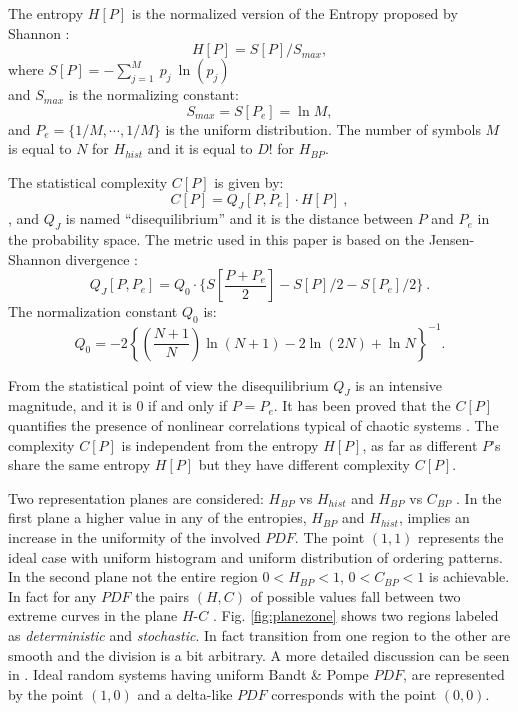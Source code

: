 The entropy $H[P]$ is the normalized version of the Entropy proposed by Shannon \cite{Shannon1949a}:
\begin{equation}\label{eq:sha}
H[P] = S[P] /S_{max},
\end{equation}
where $S[P]=-\sum _{j=1}^{M}~p_j~\ln( p_j )$\\ and $S_{max}$ is
the normalizing constant:
\begin{equation}
\label{eq:Smax} S_{max}= S[P_e] = \ln M,
\end{equation}
and $P_e=\{ 1/M, \cdots,1/M\}$ is the uniform distribution. The number of symbols $M$ is equal to $N$ for $H_{hist}$ and it is equal to $D!$ for $H_{BP}$.

The statistical complexity $C[P]$ is given by:
\begin{equation}
\label{eq:inten}
C[{P}]=Q_{J}[{P,P_e}]\cdot H[{P}] \ ,
\end{equation}
, and
$Q_{J}$ is named ``disequilibrium'' and it is the distance between $P$ and $P_e$ 
 in the probability space. The metric used in this paper is based on the Jensen-Shannon divergence
 \cite{Lamberti2004}:
\begin{equation}
\label{eq:disequi}
Q_{J}[{P,P_e}]= Q_0 \cdot \{S[\frac{P+P_e}{2}]-S[P]/2-S[P_e]/2 \} \ .
\end{equation}
The normalization constant $Q_0$ is:
\begin{equation}
\label{eq:q0j}
Q_0=-2 \left\{ \left( \frac{N+1}{N} \right) \ln(N+1) - 2 \ln(2N) + \ln N \right\}^{-1} .
\end{equation}

From the statistical point of view the disequilibrium $Q_J$ is an
intensive magnitude, and it is $0$ if and only if $P=P_e$. It has
been proved that the $C[P]$ quantifies the presence of nonlinear
correlations typical of chaotic systems
\cite{Martin2003,Lamberti2004}. The complexity $C[P]$ is
independent from the entropy $H[P]$, as far as different $P$'s share
the same entropy $H[P]$ but they have different complexity
$C[P]$.

Two representation planes are considered: $H_{BP}$ vs $H_{hist}$ \cite{DeMicco2008} and $H_{BP}$ vs $C_{BP}$ \cite{Rosso2007C}. In the first plane a higher value in any of the entropies, $H_{BP}$ and $H_{hist}$, implies an increase in the uniformity of the involved $PDF$. The point $(1,1)$ represents the ideal case with uniform histogram and uniform distribution of ordering patterns. In the second plane not the entire region $0<H_{BP}<1$, $0<C_{BP}<1$ is achievable. In fact for any $PDF$ the pairs $(H,C)$ of possible values fall between two extreme curves in the plane $H$-$C$ \cite{Anteneodo1996}. Fig. \ref{fig:planezone} shows two regions labeled as \textit{deterministic} and \textit{stochastic}. In fact transition from one region to the other are smooth and the division is a bit arbitrary. A more detailed discussion can be seen in \cite{Rosso2007C}. Ideal random systems having uniform Bandt \& Pompe $PDF$, are represented by the point $(1,0)$ \cite{Gonzalez2005} and a delta-like $PDF$ corresponds with the point $(0,0)$. 

